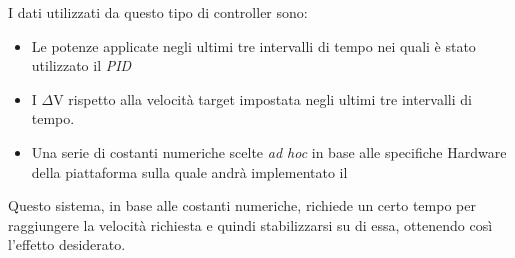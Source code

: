 I dati utilizzati da questo tipo di controller sono:
\begin{itemize}
    \item Le potenze applicate negli ultimi tre intervalli di tempo nei
        quali è stato utilizzato il \emph{PID}
    \item I $\Delta$V rispetto alla velocità target impostata negli ultimi
        tre intervalli di tempo.
    \item Una serie di costanti numeriche scelte \emph{ad hoc} in base alle
        specifiche Hardware della piattaforma sulla quale andrà
        implementato il \PID{}
\end{itemize}

Questo sistema, in base alle costanti numeriche, richiede un certo tempo
per raggiungere la velocità richiesta e quindi stabilizzarsi su di essa,
ottenendo così l'effetto desiderato.

\cleardoublepage
